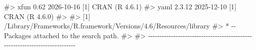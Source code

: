 \documentclass[
  10pt,
  a4paper,
]{book}
\newenvironment{Shaded}{\begin{snugshade}}{\end{snugshade}}
\newcommand{\CommentTok}[1]{\textcolor[rgb]{0.37,0.37,0.37}{#1}}
\begin{document}
\begin{Shaded}
\begin{Highlighting}[]
\CommentTok{\#\textgreater{}  xfun            0.62    2026{-}10{-}16 [1] CRAN (R 4.6.1)}
\CommentTok{\#\textgreater{}  yaml            2.3.12  2025{-}12{-}10 [1] CRAN (R 4.6.0)}
\CommentTok{\#\textgreater{} }
\CommentTok{\#\textgreater{}  [1] /Library/Frameworks/R.framework/Versions/4.6/Resources/library}
\CommentTok{\#\textgreater{}  * {-}{-} Packages attached to the search path.}
\CommentTok{\#\textgreater{} }
\CommentTok{\#\textgreater{} {-}{-}{-}{-}{-}{-}{-}{-}{-}{-}{-}{-}{-}{-}{-}{-}{-}{-}{-}{-}{-}{-}{-}{-}{-}{-}{-}{-}{-}{-}{-}{-}{-}{-}{-}{-}{-}{-}{-}{-}{-}{-}{-}{-}{-}{-}{-}{-}{-}{-}{-}{-}{-}{-}{-}{-}{-}{-}{-}{-}{-}{-}{-}{-}{-}{-}{-}{-}{-}{-}{-}{-}{-}{-}{-}{-}}
\end{Highlighting}
\end{Shaded}




\backmatter
\end{document}

